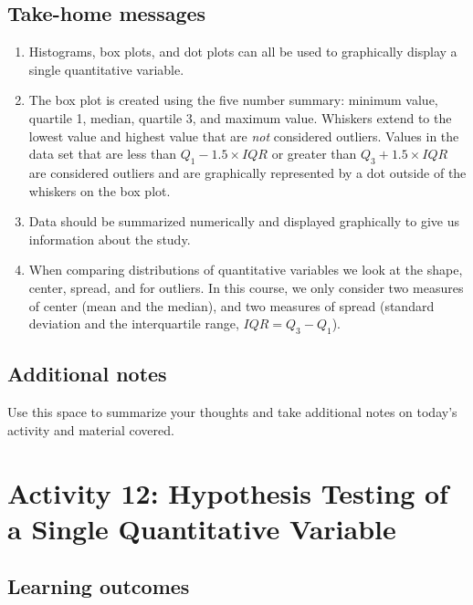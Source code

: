 \documentclass[
]{report}
\begin{document}
\subsection{Take-home messages}\label{take-home-messages}

\begin{enumerate}
\def\labelenumi{\arabic{enumi}.}
\item
  Histograms, box plots, and dot plots can all be used to graphically display a single quantitative variable.
\item
  The box plot is created using the five number summary: minimum value, quartile 1, median, quartile 3, and maximum value. Whiskers extend to the lowest value and highest value that are \emph{not} considered outliers. Values in the data set that are less than \(Q_1 - 1.5\times IQR\) or greater than \(Q_3 + 1.5\times IQR\) are considered outliers and are graphically represented by a dot outside of the whiskers on the box plot.
\item
  Data should be summarized numerically and displayed graphically to give us information about the study.
\item
  When comparing distributions of quantitative variables we look at the shape, center, spread, and for outliers. In this course, we only consider two measures of center (mean and the median), and two measures of spread (standard deviation and the interquartile range, \(IQR = Q_3 - Q_1\)).
\end{enumerate}

\subsection{Additional notes}\label{additional-notes}

Use this space to summarize your thoughts and take additional notes on today's activity and material covered.

\newpage

\section{Activity 12: Hypothesis Testing of a Single Quantitative Variable}\label{activity-12-hypothesis-testing-of-a-single-quantitative-variable}


\subsection{Learning outcomes}\label{learning-outcomes-1}
\end{document}
